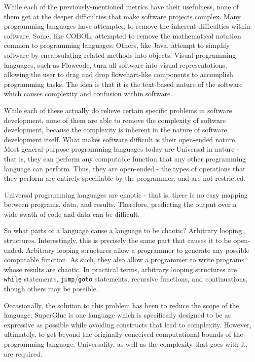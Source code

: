 While each of the previously-mentioned metrics have their usefulness, none of them get at the deeper difficulties that make software projects complex.  Many programming languages have attempted to remove the inherent difficulties within software.  Some, like COBOL, attempted to remove the mathematical notation common to programming languages.  Others, like Java, attempt to simplify software by encapsulating related methods into objects.  Visual programming languages, such as Flowcode, turn all software into visual representations, allowing the user to drag and drop flowchart-like components to accomplish programming tasks.  The idea is that it is the text-based nature of the software which causes complexity and confusion within software.

While each of these actually do relieve certain specific problems in software development, none of them are able to remove the complexity of software development, because the complexity is inherent in the nature of software development itself.  What makes software difficult is their open-ended nature.  Most general-purpose programming languages today are Universal in nature - that is, they can perform any computable function that any other programming language can perform.  Thus, they are open-ended - the types of operations that they perform are entirely specifiable by the programmer, and are not restricted.

Universal programming languages are chaotic - that is, there is no easy mapping between programs, data, and results.  Therefore, predicting the output over a wide swath of code and data can be difficult.  

So what parts of a language cause a language to be chaotic?  Arbitrary looping structures.  Interestingly, this is precisely the same part that causes it to be open-ended.  Arbitrary looping structures allow a programmer to generate any possible computable function.  As such, they also allow a programmer to write programs whose results are chaotic.  In practical terms, arbitrary looping structures are \verb+while+ statements, \verb+jump+/\verb+goto+ statements, recursive functions, and continuations, though others may be possible.

Occasionally, the solution to this problem has been to reduce the scope of the language.  SuperGlue is one language which is specifically designed to be as expressive as possible while avoiding constructs that lead to complexity.\cite{mcdirmid}  However, ultimately, to get beyond the originally conceived computational bounds of the programming language, Universality, as well as the complexity that goes with it, are required.

